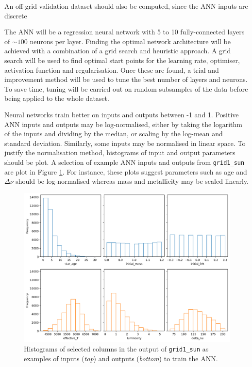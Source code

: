 \documentclass[twocolumn]{aastex63}
\newcommand{\Dnu}{\Delta\nu}
\begin{document}
An off-grid validation dataset should also be computed, since the ANN inputs are discrete

The ANN will be a regression neural network with 5 to 10 fully-connected layers of $\sim 100$ neurons per layer. Finding the optimal network architecture will be achieved with a combination of a grid search and heuristic approach. A grid search will be used to find optimal start points for the learning rate, optimiser, activation function and regularisation. Once these are found, a trial and improvement method will be used to tune the best number of layers and neurons. To save time, tuning will be carried out on random subsamples of the data before being applied to the whole dataset.

Neural networks train better on inputs and outputs between -1 and 1. Positive ANN inputs and outputs may be log-normalised, either by taking the logarithm of the inputs and dividing by the median, or scaling by the log-mean and standard deviation. Similarly, some inputs may be normalised in linear space. To justify the normalisation method, histograms of input and output parameters should be plot. A selection of example ANN inputs and outputs from \texttt{grid1\_sun} are plot in Figure \ref{fig:hist}. For instance, these plots suggest parameters such as age and $\Dnu$ should be log-normalised whereas mass and metallicity may be scaled linearly.

\begin{figure}[htb!]
    \includegraphics[width=1.0\textwidth]{figures/grid1_histogram.png}
    \caption{Histograms of selected columns in the output of \texttt{grid1\_sun} as examples of inputs (\textit{top}) and outputs (\textit{bottom}) to train the ANN.}
    \label{fig:hist}
\end{figure}
\end{document}
